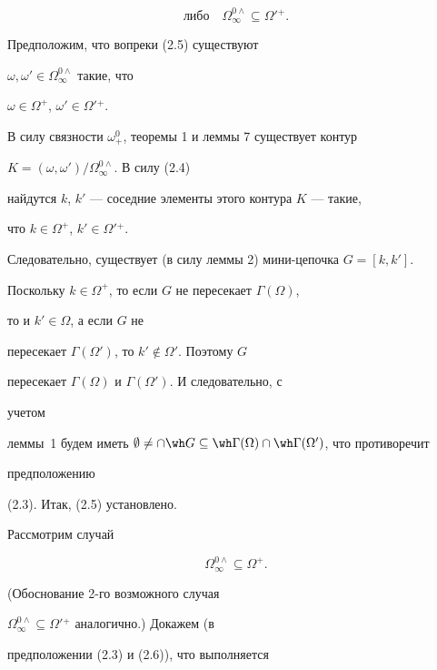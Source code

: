 \begin{pf}
\begin{equation}
\text{либо}\quad 


\Omega^{0\wedge}_\infty\subseteq\Omega'{}^+. 


\end{equation} 


Предположим, что вопреки (2.5) существуют 


$\omega,\omega'\in\Omega^{0\wedge}_\infty$ такие, что 


$\omega\in\Omega^+$, $\omega'\in\Omega'{}^+$. 


В силу связности $\omega^0_+$, теоремы 1 и леммы 7 существует контур 


$K=(\omega,\omega')/\Omega^{0\wedge}_\infty$. В силу (2.4) 


найдутся $k$, $k'$ --- соседние элементы этого контура $K$ --- такие, 


что $k\in\Omega^+$, $k'\in\Omega'{}^+$. 


Следовательно, существует (в силу леммы 2) мини-цепочка $G=[k,k']$. 


 


Поскольку $k\in\Omega^+$, то если $G$ не пересекает $\Gamma(\Omega)$, 


то и $k'\in\Omega$, а если $G$ не 


пересекает $\Gamma(\Omega')$, то $k'\notin\Omega'$. Поэтому $G$ 


пересекает $\Gamma(\Omega)$ и $\Gamma(\Omega')$. И следовательно, с 


учетом 


леммы~1 будем иметь $\emptyset\ne\cap\wh 


G\subseteq\wh\Gamma(\Omega)\cap\wh\Gamma(\Omega')$, что противоречит 


предположению 


(2.3). Итак, (2.5) установлено. 


 


Рассмотрим случай 


\begin{equation} 


\Omega^{0\wedge}_\infty\subseteq\Omega^+. 


\end{equation} 


(Обоснование 2-го возможного случая 


$\Omega^{0\wedge}_\infty\subseteq\Omega'{}^+$ аналогично.) Докажем (в 


предположении (2.3) и (2.6)), что выполняется 



\end{pf}
